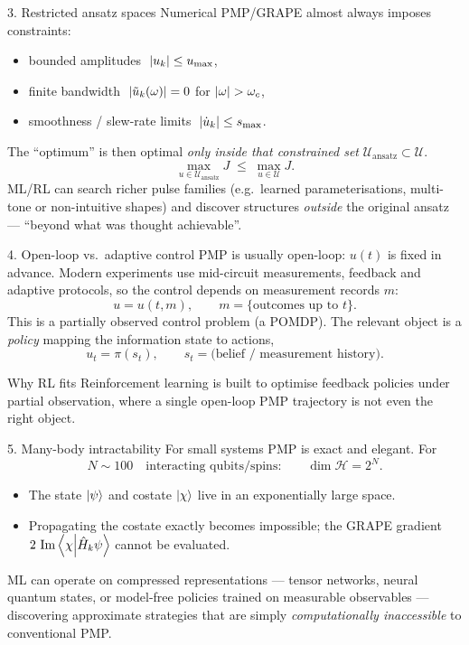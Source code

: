 \documentclass[10pt,aspectratio=169]{beamer}
\newcommand{\Hop}{\hat H}
\renewcommand{\Im}{\operatorname{Im}}
\begin{document}
\begin{frame}{3. Restricted ansatz spaces}
  Numerical PMP/GRAPE almost always imposes constraints:
  \begin{itemize}
    \item bounded amplitudes $\;\abs{u_k}\le u_{\max}$,
    \item finite bandwidth $\;\abs{\tilde u_k(\omega)}=0$ for $\abs{\omega}>\omega_c$,
    \item smoothness / slew-rate limits $\;\abs{\dot u_k}\le s_{\max}$.
  \end{itemize}
  The ``optimum'' is then optimal \emph{only inside that constrained set}
  $\mathcal{U}_{\text{ansatz}}\subset\mathcal{U}$.
  \begin{equation}
    \max_{u\in\mathcal{U}_{\text{ansatz}}} J \;\le\; \max_{u\in\mathcal{U}} J .
  \end{equation}
  ML/RL can search richer pulse families (e.g.\ learned parameterisations,
  multi-tone or non-intuitive shapes) and discover structures \emph{outside}
  the original ansatz --- ``beyond what was thought achievable''.
\end{frame}

\begin{frame}{4. Open-loop vs.\ adaptive control}
  PMP is usually \alert{open-loop}: $u(t)$ is fixed in advance. Modern
  experiments use mid-circuit measurements, feedback and adaptive protocols, so
  the control depends on measurement records $m$:
  \begin{equation}
    u = u(t,m), \qquad m=\{\text{outcomes up to }t\}.
  \end{equation}
  This is a \alert{partially observed} control problem (a POMDP). The relevant
  object is a \emph{policy} mapping the information state to actions,
  \[
    u_t = \pi(s_t), \qquad s_t = \text{(belief / measurement history)} .
  \]
  \begin{alertblock}{Why RL fits}
    Reinforcement learning is built to optimise feedback policies under partial
    observation, where a single open-loop PMP trajectory is not even the right
    object.
  \end{alertblock}
\end{frame}

\begin{frame}{5. Many-body intractability}
  For small systems PMP is exact and elegant. For
  \[
    N \sim 100 \quad\text{interacting qubits/spins:}\qquad \dim\mathcal{H}=2^{N}.
  \]
  \begin{itemize}
    \item The state $\ket\psi$ and costate $\ket\chi$ live in an exponentially
          large space.
    \item Propagating the costate exactly becomes impossible; the GRAPE gradient
          $2\,\Im\braket{\chi}{\Hop_k\psi}$ cannot be evaluated.
  \end{itemize}
  ML can operate on \alert{compressed} representations --- tensor networks,
  neural quantum states, or model-free policies trained on measurable
  observables --- discovering approximate strategies that are simply
  \emph{computationally inaccessible} to conventional PMP.
\end{frame}
\end{document}
